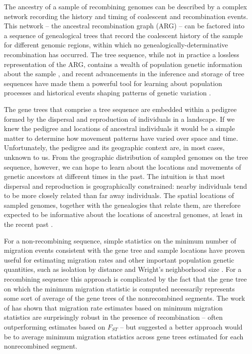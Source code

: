 The ancestry of a sample of recombining genomes can be described by a complex
network recording the history and timing of coalescent and recombination
events. This network -- the ancestral recombination graph (ARG) -- can be
factored into a sequence of genealogical trees that record the coalescent 
history of the sample for different genomic regions, within which no 
genealogically-determinative recombination has occurred. The tree sequence, 
while not in practice a lossless representation of the ARG, contains a wealth 
of population genetic information about the sample \citep{Ralph_etal_2020}, and
recent advancements in the inference and storage of tree sequences have made 
them a powerful tool for learning about population processes and historical 
events shaping patterns of genetic variation
\citep{Anderson-Trocme_etal_2023, Kelleher_etal_2016, Kelleher_etal_2019}.

The gene trees that comprise a tree sequence are embedded within a pedigree
formed by the dispersal and reproduction of individuals in a landscape. If we 
knew the pedigree and locations of ancestral individuals it would be a simple 
matter to determine how movement patterns have varied over space and time. 
Unfortunately, the pedigree and its geographic context are, in most cases, 
unknown to us. From the geographic distribution of sampled genomes on the tree
sequence, however, we can hope to learn about the locations and movements of 
genetic ancestors at different times in the past. The intuition is that most
dispersal and reproduction is geographically constrained: nearby individuals 
tend to be more closely related than far away individuals.  The spatial 
locations of sampled genomes, together with the genealogies that relate them, 
are therefore expected to be informative about the locations of ancestral 
genomes, at least in the recent past \citep{Wakeley_1999, Wilkins_2004}.

For a non-recombining sequence, simple statistics on the minimum number of
migration events consistent with the gene tree and sample locations have
proven useful for estimating migration rates and other important population
genetic quantities, such as isolation by distance and Wright's neighborhood
size \citep{Slatkin_Maddison_1989, Slatkin_Maddison_1990}. For a recombining
sequence this approach is complicated by the fact that the gene tree on which
the minimum migration statistic is computed necessarily represents some sort of
average of the gene trees of the nonrecombined segments. The work of 
\citet{Hudson_etal_1992} has shown that migration rate estimates based on
minimum migration statistics are surprisingly robust in the presence of
recombination -- often outperforming estimates based on $F_{ST}$ -- but 
suggested a better approach would be to average minimum migration 
statistics across gene trees estimated for each nonrecombined segment.

